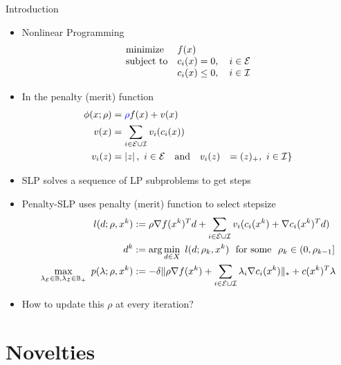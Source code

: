 \documentclass[8pt]{beamer}
\begin{document}
\begin{frame}[c]{Introduction}
\vfill
\begin{itemize}
\item   Nonlinear Programming
\[
\begin{array}{ll}
\mbox{minimize}&f(x)\\ 
\mbox{subject to}&c_i(x)= 0 ,  \quad i\in{\cal E}\\
& c_i(x) \le 0, \quad i\in {\cal I}
\end{array}
\] 
\item In the  penalty (merit) function 
$$\begin{aligned} \phi(x;\rho)  &= {\color{blue} \rho } f(x)+v(x) \\
v(x) &= \sum_{i\in{\cal E}\cup{\cal I}} v_i(c_i(x)) \\
v_i(z) & =   \left| z \right|,\  i\in{\cal E}\quad\text{and}\quad v_i(z) &=  (z)_+,\  i\in{\cal I} \}
\end{aligned}$$
 \item SLP solves a sequence of LP subproblems to get steps
 \item Penalty-SLP uses penalty (merit) function to select stepsize
 \begin{equation}
\begin{aligned} 
l(d; \rho, x^k) & := \rho \nabla f(x^k)^Td + \sum_{i\in{\cal E}\cup{\cal I}} v_i( c_i(x^k) + \nabla c_i(x^k)^Td)\\
   d^k & := \arg\min_{d \in X}\ l(d; \rho_k, x^k)\ \ \text{for some}\ \ \rho_k \in (0,\rho_{k-1}] \\
   \max_{\lambda_{{\cal E}} \in \mathbb{B}, \lambda_{{\cal I}}\in\mathbb{B}_+}\ p(\lambda; \rho, x^k) & :=  -  \delta    \|\rho \nabla f(x^k)+\sum_{i\in{\cal E}\cup{\cal I}}\lambda_i \nabla c_i(x^k) \|_* + c(x^k)^T\lambda
\end{aligned}
\end{equation}
\item How to update this $\rho$ at every iteration? 
\end{itemize}
\end{frame}


  



\section[Novelties]{Novelties}
\end{document}
